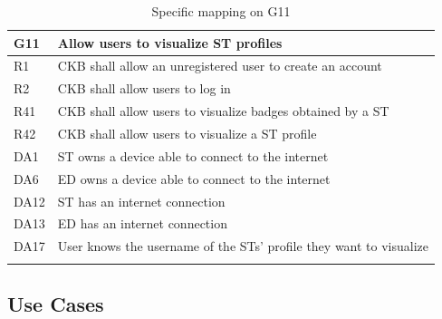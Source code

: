   \begin{longtable}{|l|p{12cm}| }
    \hline
    \textbf{G11} & \textbf{Allow users to visualize ST profiles}      \\
    \hline
    R1 & CKB shall allow an unregistered user to create an account \\
    \hline
    R2 & CKB shall allow users to log in \\
    \hline
    R41 & CKB shall allow users to visualize badges obtained by a ST \\
    \hline
    R42 & CKB shall allow users to visualize a ST profile \\
    \hline
    DA1 & ST owns a device able to connect to the internet \\
    \hline
    DA6 & ED owns a device able to connect to the internet \\
    \hline
    DA12 & ST has an internet connection \\
    \hline
    DA13 & ED has an internet connection \\
    \hline
    DA17 & User knows the username of the STs' profile they want to visualize \\
    \hline
    \caption{Specific mapping on G11}
    \label{tab:mappingG11}
  \end{longtable}

\pagebreak

\subsection{Use Cases}
\label{ss:Use_cases}%

